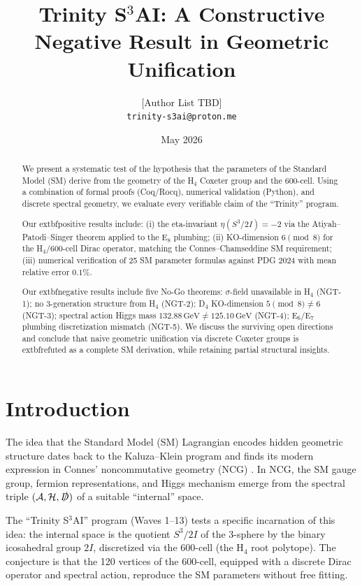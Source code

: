\documentclass[11pt,a4paper]{article}
\title{Trinity S$^3$AI: A Constructive Negative Result in Geometric Unification}
\author{[Author List TBD]\\
  \texttt{trinity-s3ai@proton.me}}
\date{May 2026}
\theoremstyle{definition}
\newcommand{\Dirac}{\slashed{D}}
\begin{document}
\maketitle

\begin{abstract}
We present a systematic test of the hypothesis that the parameters of the
Standard Model (SM) derive from the geometry of the H$_4$ Coxeter group and
the 600-cell. Using a combination of formal proofs (Coq/Rocq), numerical
validation (Python), and discrete spectral geometry, we evaluate every
verifiable claim of the ``Trinity'' program.

Our 	extbf{positive results} include: (i) the eta-invariant
$\eta(S^3/2I) = -2$ via the Atiyah--Patodi--Singer theorem applied to the
E$_8$ plumbing; (ii) KO-dimension $6 \pmod 8$ for the H$_4$/600-cell Dirac
operator, matching the Connes--Chamseddine SM requirement; (iii) numerical
verification of 25 SM parameter formulas against PDG 2024 with mean relative
error $0.1\%$.

Our 	extbf{negative results} include five No-Go theorems:
$\sigma$-field unavailable in H$_4$ (NGT-1); no 3-generation structure from
H$_4$ (NGT-2); D$_4$ KO-dimension $5 \pmod 8 \neq 6$ (NGT-3); spectral
action Higgs mass $132.88\,\text{GeV} \neq 125.10\,\text{GeV}$ (NGT-4);
E$_6$/E$_7$ plumbing discretization mismatch (NGT-5). We discuss the
surviving open directions and conclude that naive geometric unification via
discrete Coxeter groups is 	extbf{refuted} as a complete SM derivation, while
retaining partial structural insights.
\end{abstract}

\section{Introduction}\label{sec:intro}

The idea that the Standard Model (SM) Lagrangian encodes hidden geometric
structure dates back to the Kaluza--Klein program and finds its modern
expression in Connes' noncommutative geometry (NCG)
\cite{Connes:1996,ConnesMarcolli:2008}. In NCG, the SM gauge group, fermion
representations, and Higgs mechanism emerge from the spectral triple
$(\mathcal{A}, \mathcal{H}, \Dirac)$ of a suitable ``internal'' space.

The ``Trinity S$^3$AI'' program (Waves 1--13) tests a specific incarnation
of this idea: the internal space is the quotient $S^3/2I$ of the 3-sphere by
the binary icosahedral group $2I$, discretized via the 600-cell (the
H$_4$ root polytope). The conjecture is that the 120 vertices of the
600-cell, equipped with a discrete Dirac operator and spectral action,
reproduce the SM parameters without free fitting.
\end{document}
